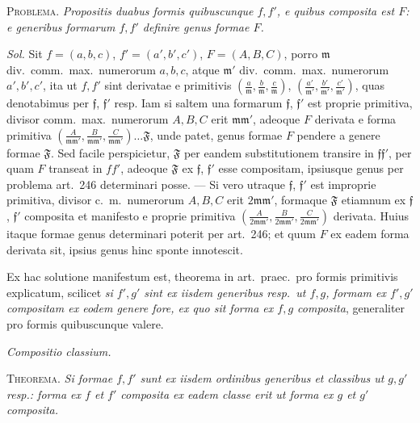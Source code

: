 \textsc{Problema.} \textit{Propositis duabus formis quibuscunque $f,f'$, e quibus composita est $F$: e generibus formarum $f,f'$ definire genus formae $F$.}

\textit{Sol.} Sit $f=(a,b,c)$, $f'=(a',b',c')$, $F=(A,B,C)$, porro $\mathfrak{m}$ div.\ comm.\ max.\ numerorum $a,b,c$, atque $\mathfrak{m}'$ div.\ comm.\ max.\ numerorum $a',b',c'$, ita ut $f,f'$ sint derivatae e primitivis $(\frac{a}{\mathfrak{m}},\allowbreak \frac{b}{\mathfrak{m}},\allowbreak \frac{c}{\mathfrak{m}})$, $(\frac{a'}{\mathfrak{m}'},\allowbreak \frac{b'}{\mathfrak{m}'},\allowbreak \frac{c'}{\mathfrak{m}'})$, quas denotabimus per $\mathfrak{f}$, $\mathfrak{f}'$ resp. Iam si saltem una formarum $\mathfrak{f}$, $\mathfrak{f}'$ est proprie primitiva, divisor comm.\ max.\ numerorum $A,B,C$ erit $\mathfrak{m}\mathfrak{m}'$, adeoque $F$ derivata e forma primitiva $(\frac{A}{\mathfrak{m}\mathfrak{m}'},\allowbreak \frac{B}{\mathfrak{m}\mathfrak{m}'},\allowbreak \frac{C}{\mathfrak{m}\mathfrak{m}'})\ldots\mathfrak{F}$, unde patet, genus formae $F$ pendere a genere formae $\mathfrak{F}$. Sed facile perspicietur, $\mathfrak{F}$ per eandem substitutionem transire in $\mathfrak{f}\mathfrak{f}'$, per quam $F$ transeat in $ff'$, adeoque $\mathfrak{F}$ ex $\mathfrak{f}$, $\mathfrak{f}'$ esse compositam, ipsiusque genus per problema art.~246 determinari posse. --- Si vero utraque $\mathfrak{f}$, $\mathfrak{f}'$ est improprie primitiva, divisor c.~m.\ numerorum $A,B,C$ erit $2\mathfrak{m}\mathfrak{m}'$, formaque $\mathfrak{F}$ etiamnum ex $\mathfrak{f}$, $\mathfrak{f}'$ composita et manifesto e proprie primitiva $(\frac{A}{2\mathfrak{m}\mathfrak{m}'},\allowbreak \frac{B}{2\mathfrak{m}\mathfrak{m}'},\allowbreak \frac{C}{2\mathfrak{m}\mathfrak{m}'})$ derivata. Huius itaque formae genus determinari poterit per art.~246; et quum $F$ ex eadem forma derivata sit, ipsius genus hinc sponte innotescit.

Ex hac solutione manifestum est, theorema in art.\ praec.\ pro formis primitivis explicatum, scilicet \textit{si $f',g'$ sint ex iisdem generibus resp.\ ut $f,g$, formam ex $f',g'$ compositam ex eodem genere fore, ex quo sit forma ex $f,g$ composita}, generaliter pro formis quibuscunque valere.
\begin{center}
\textit{Compositio classium.}
\end{center}

\textsc{Theorema.} \textit{Si formae $f,f'$ sunt ex iisdem ordinibus generibus et classibus ut $g,g'$ resp.: forma ex $f$ et $f'$ composita ex eadem classe erit ut forma ex $g$ et $g'$ composita.}

